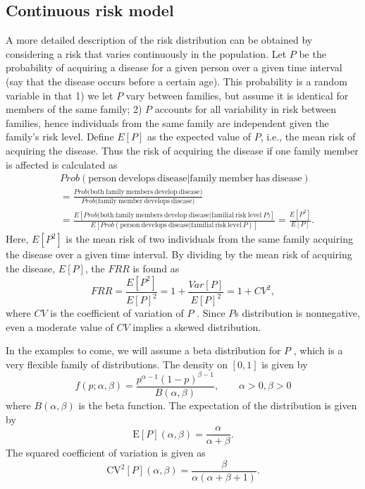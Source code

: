 \documentclass{bmcart}
\begin{document}
\subsection*{Continuous risk model}
A more detailed description of the risk distribution can be obtained by considering a risk that varies continuously in the population. Let $P$ be the probability of acquiring a disease for a given person over a given time interval (say that the disease occurs before a certain age). This probability is a random variable in that 1) we let $P$ vary between families, but assume it is identical for members of the same family; 2) $P$ accounts for all variability in risk between families, hence individuals from the same family are independent given the family's risk level. Define $E[P]$ as the expected value of $P$, i.e., the mean risk of acquiring the disease. Thus the risk of acquiring the disease if one family member is affected is calculated as
\begin{equation*}
\begin{split}
&Prob(\mathrm{person\ develops\ disease}|\mathrm{family\ member\ has\ disease})\\
&=\frac{Prob\mathrm{(both\ family\ members\ develop\ disease})}{Prob\mathrm{(family\ member\ develops\ disease})} \\
&=\frac{E[Prob\mathrm{(both\ family\ members\ develop\ disease|familial\ risk\ level\ } P)]}{E[Prob(\mathrm{person\ develops\ disease|familial\ risk\ level\ } P)]} = \frac{E[P^2]}{E[P]}.
\end{split}
\end{equation*}
Here, $E[P^{2}]$ is the mean risk of two individuals from the same family acquiring the disease over a given time interval. By dividing by the mean risk of acquiring the disease, $E[P]$, the $FRR$ is found as
\begin{equation}
FRR=\frac{E[P^{2}]}{E[P]^{2}} =1+\frac{Var[P]}{E[P]^{2}}=1+CV^{2},
\label{FRR-CV}
\end{equation}
where $CV$ is the coefficient of variation of $P$ \cite{moger2004analysis,aalen2014understanding,ABG}. Since $P$s distribution is nonnegative, even a moderate value of $CV$ implies a skewed distribution.

In the examples to come, we will assume a beta distribution for $P$ \cite{smith1971recurrence}, which is a very flexible family of distributions. The density on $[0,1]$ is given by%
\[
f(p;\alpha,\beta)=\frac{p^{\alpha-1}(1-p)^{\beta-1}}{B(\alpha,\beta)}
,\qquad\alpha>0,\beta>0
\]
where $B(\alpha,\beta)$ is the beta function. The expectation of the distribution is given by
\begin{equation}
\mathrm{E}[P](\alpha,\beta)=\frac{\alpha}{\alpha+\beta}.
\label{expected}
\end{equation}
The squared coefficient of variation is given as
\begin{equation}
\mathrm{CV}^{2}[P](\alpha,\beta)=\frac{\beta}{\alpha(\alpha+\beta+1)}.
\label{CV2}
\end{equation}
\end{document}
